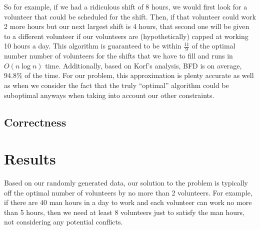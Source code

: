 \documentclass[11pt]{article}
\newif\ifcomment
\newcommand{\comment}[1]{\ifcomment#1\fi}
\theoremstyle{definition}
\begin{document}
\begin{multicols}{2}
So for example, if we had a ridiculous shift of 8 hours, we would first look for a volunteer that could be scheduled for the shift.
Then, if that volunteer could work 2 more hours but our next largest shift is 4 hours, that second one will be given to a different volunteer if our volunteers are (hypothetically) capped at working 10 hours a day.
This algorithm is guaranteed to be within $\frac{11}{9}$ of the optimal number number of volunteers for the shifts that we have to fill and runs in $O(n\log n)$ time.
Additionally, based on Korf's analysis, BFD is on average, 94.8\% of the time.
For our problem, this approximation is plenty accurate as well as when we consider the fact that the truly ``optimal'' algorithm could be suboptimal anyways when taking into account our other constraints.
\comment{
Our program takes the following as input from the event organizers:
\begin{itemize}
\item A list of volunteers each with their preferences and the jobs they can do.
\item A list of jobs and the shifts for the jobs.
\item The maximum number of hours a volunteer can work in a day.
\item The maximum and minimum number of hours a volunteer can work total for the event
\end{itemize}
However, in script form, we allowed these inputs to be hardcoded in as constants.
Savoy Swing Club does not have any upcoming events until September of this year so the priority is getting a good algorithm that makes favorable schedules.

Given a large pool of potential volunteers, we randomly pick sufficiently sized subsets of the volunteers and try to match them.
One would think that this probably doesn't give a very good result but it turns out, based on the very lowest possible bound of the number of volunteers required to run the event, our algorithm usually finds an schedules with a factor of 2 volunteers.

We encode the problem of volunteers having external time conflicts by pre-filling each volunteer's schedule with ``jobs'' that are labeled ``UNAVAILABLE''.
} %
\subsection{Correctness}


\section{Results}
Based on our randomly generated data, our solution to the problem is typically off the optimal number of volunteers by no more than 2 volunteers.
For example, if there are 40 man hours in a day to work and each volunteer can work no more than 5 hours, then we need at least 8 volunteers just to satisfy the man hours, not considering any potential conflicts.


\end{multicols}
\end{document}
